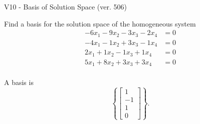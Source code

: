 \begin{exercise}
  \begin{exerciseTitle}V10 - Basis of Solution Space (ver. 506)\end{exerciseTitle}
  \begin{exerciseStatement}
    Find a basis for the solution space of the homogeneous system 
\begin{align*}
 -6 x_ 1 -9 x_ 2 -3 x_ 3 -2 x_ 4 &= 0  \\ 
  -4 x_ 1 -1 x_ 2 + 3 x_ 3 -1 x_ 4 &= 0  \\ 
  2 x_ 1 + 1 x_ 2 -1 x_ 3 + 1 x_ 4 &= 0  \\ 
  5 x_ 1 + 8 x_ 2 + 3 x_ 3 + 3 x_ 4 &= 0  \\ 
 \end{align*}


 
  \end{exerciseStatement}

  \begin{exerciseAnswer}
   A basis is   
\[\left\{\left[\begin{array}{c}
1 \\
-1 \\
1 \\
0
\end{array}\right]\right\}.\]

  


  \end{exerciseAnswer}
\end{exercise}